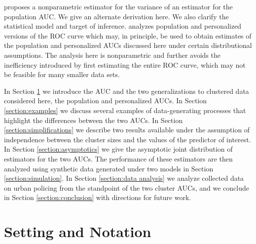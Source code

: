 \documentclass[12pt]{article}
\newcommand{\comment}[1]{
  \iftoggle{commenttoggle}{
    {\normalsize{\color{red}{ #1}}\normalsize}
  }
  {}
}
\begin{document}
\citet{obuchowski1997} proposes a nonparametric estimator for the
variance of an estimator for the population AUC. We give an alternate
derivation here. We also clarify the statistical model and target of
inference. \citet{michael2019} analyzes population and personalized
versions of the ROC curve which may, in principle, be used to obtain
estimates of the population and personalized AUCs discussed here under
certain distributional assumptions. The analysis here is nonparametric
and further avoids the inefficiency introduced by first estimating the
entire ROC
curve, which may not be feasible for many smaller data sets.%

In Section \ref{section:setting} we introduce the AUC
and the two generalizations to clustered data considered here, the
population and personalized AUCs. In Section \ref{section:examples} we
discuss several examples of data-generating processes that highlight
the differences between the two AUCs. In Section
\ref{section:simplifications} we describe two results available under
the assumption of independence between the cluster sizes and the
values of the predictor of interest. In Section \ref{section:asymptotics} we
give the asymptotic joint distribution of estimators for the two AUCs. The performance of these estimators are then
analyzed using synthetic data generated under two models in Section
\ref{section:simulation}. In Section \ref{section:data analysis} we
analyze collected data on urban policing from the standpoint of the
two cluster AUCs, and we conclude in Section \ref{section:conclusion}
with directions for future work.


\section{Setting and Notation}\label{section:setting}
\end{document}
